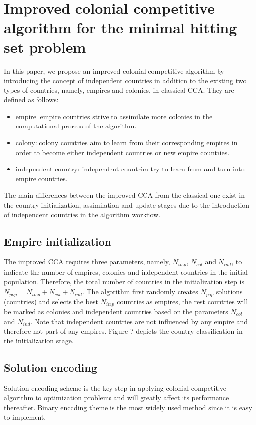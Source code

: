\section{Improved colonial competitive algorithm for the minimal hitting set problem}
In this paper, we propose an improved colonial competitive algorithm by introducing the concept of independent countries in addition to the existing two types of countries, namely, empires and colonies, in classical CCA.
They are defined as follows:
\begin{itemize}
	\item empire: empire countries strive to assimilate more colonies in the computational process of the algorithm.
	\item colony: colony countries aim to learn from their corresponding empires in order to become either independent countries or new empire countries.
	\item independent country: independent countries try to learn from and turn into empire countries.
\end{itemize}

The main differences between the improved CCA from the classical one exist in the country initialization, assimilation and update stages due to the introduction of independent countries in the algorithm workflow.


\subsection{Empire initialization}
The improved CCA requires three parameters, namely, $N_{imp}$, $N_{col}$ and $N_{ind}$, to indicate the number of empires, colonies and independent countries in the initial population.
Therefore, the total number of countries in the initialization step is $N_{pop} = N_{imp} + N_{col} + N_{ind}$.
The algorithm first randomly creates $N_{pop}$ solutions (countries) and selects the best $N_{imp}$ countries as empires, the rest countries will be marked as colonies and independent countries based on the parameters $N_{col}$ and $N_{ind}$.
Note that independent countries are not influenced by any empire and therefore not part of any empires.
Figure ? depicts the country classification in the initialization stage.



\subsection{Solution encoding}
Solution encoding scheme is the key step in applying colonial competitive algorithm to optimization problems and will greatly affect its performance thereafter.
Binary encoding theme is the most widely used method since it is easy to implement.

